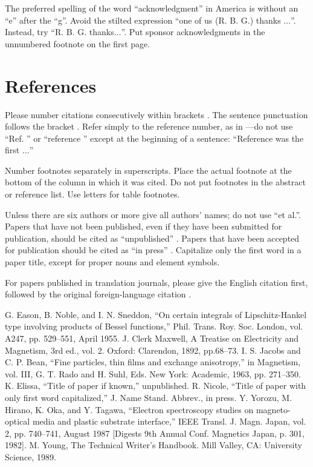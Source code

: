 \documentclass[conference]{IEEEtran}
\begin{document}
The preferred spelling of the word ``acknowledgment'' in America is without 
an ``e'' after the ``g''. Avoid the stilted expression ``one of us (R. B. 
G.) thanks $\ldots$''. Instead, try ``R. B. G. thanks$\ldots$''. Put sponsor 
acknowledgments in the unnumbered footnote on the first page.

\section*{References}

Please number citations consecutively within brackets \cite{b1}. The 
sentence punctuation follows the bracket \cite{b2}. Refer simply to the reference 
number, as in \cite{b3}---do not use ``Ref. \cite{b3}'' or ``reference \cite{b3}'' except at 
the beginning of a sentence: ``Reference \cite{b3} was the first $\ldots$''

Number footnotes separately in superscripts. Place the actual footnote at 
the bottom of the column in which it was cited. Do not put footnotes in the 
abstract or reference list. Use letters for table footnotes.

Unless there are six authors or more give all authors' names; do not use 
``et al.''. Papers that have not been published, even if they have been 
submitted for publication, should be cited as ``unpublished'' \cite{b4}. Papers 
that have been accepted for publication should be cited as ``in press'' \cite{b5}. 
Capitalize only the first word in a paper title, except for proper nouns and 
element symbols.

For papers published in translation journals, please give the English 
citation first, followed by the original foreign-language citation \cite{b6}.


\begin{thebibliography}{00}
 G. Eason, B. Noble, and I. N. Sneddon, ``On certain integrals of Lipschitz-Hankel type involving products of Bessel functions,'' Phil. Trans. Roy. Soc. London, vol. A247, pp. 529--551, April 1955.
 J. Clerk Maxwell, A Treatise on Electricity and Magnetism, 3rd ed., vol. 2. Oxford: Clarendon, 1892, pp.68--73.
 I. S. Jacobs and C. P. Bean, ``Fine particles, thin films and exchange anisotropy,'' in Magnetism, vol. III, G. T. Rado and H. Suhl, Eds. New York: Academic, 1963, pp. 271--350.
 K. Elissa, ``Title of paper if known,'' unpublished.
 R. Nicole, ``Title of paper with only first word capitalized,'' J. Name Stand. Abbrev., in press.
 Y. Yorozu, M. Hirano, K. Oka, and Y. Tagawa, ``Electron spectroscopy studies on magneto-optical media and plastic substrate interface,'' IEEE Transl. J. Magn. Japan, vol. 2, pp. 740--741, August 1987 [Digests 9th Annual Conf. Magnetics Japan, p. 301, 1982].
 M. Young, The Technical Writer's Handbook. Mill Valley, CA: University Science, 1989.
\end{thebibliography}
\end{document}
